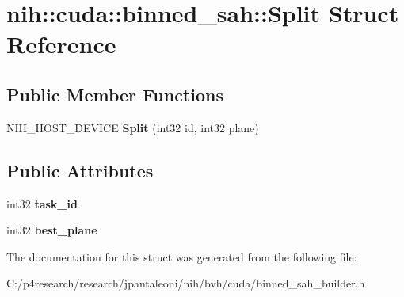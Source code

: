\hypertarget{structnih_1_1cuda_1_1binned__sah_1_1_split}{
\section{nih\-:\-:cuda\-:\-:binned\-\_\-sah\-:\-:\-Split \-Struct \-Reference}
\label{structnih_1_1cuda_1_1binned__sah_1_1_split}
}
\subsection*{\-Public \-Member \-Functions}
\begin{DoxyCompactItemize}
\item 
\hypertarget{structnih_1_1cuda_1_1binned__sah_1_1_split_a74ab233f7e51e2721e74b4cf3eff0d60}{
\-N\-I\-H\-\_\-\-H\-O\-S\-T\-\_\-\-D\-E\-V\-I\-C\-E {\bfseries \-Split} (int32 id, int32 plane)}
\label{structnih_1_1cuda_1_1binned__sah_1_1_split_a74ab233f7e51e2721e74b4cf3eff0d60}

\end{DoxyCompactItemize}
\subsection*{\-Public \-Attributes}
\begin{DoxyCompactItemize}
\item 
\hypertarget{structnih_1_1cuda_1_1binned__sah_1_1_split_a77ebba0b7f5f76acd3301643412ab8dc}{
int32 {\bfseries task\-\_\-id}}
\label{structnih_1_1cuda_1_1binned__sah_1_1_split_a77ebba0b7f5f76acd3301643412ab8dc}

\item 
\hypertarget{structnih_1_1cuda_1_1binned__sah_1_1_split_a589333c7bbb9adfefa3cc628f27da589}{
int32 {\bfseries best\-\_\-plane}}
\label{structnih_1_1cuda_1_1binned__sah_1_1_split_a589333c7bbb9adfefa3cc628f27da589}

\end{DoxyCompactItemize}


\-The documentation for this struct was generated from the following file\-:\begin{DoxyCompactItemize}
\item 
\-C\-:/p4research/research/jpantaleoni/nih/bvh/cuda/binned\-\_\-sah\-\_\-builder.\-h\end{DoxyCompactItemize}
